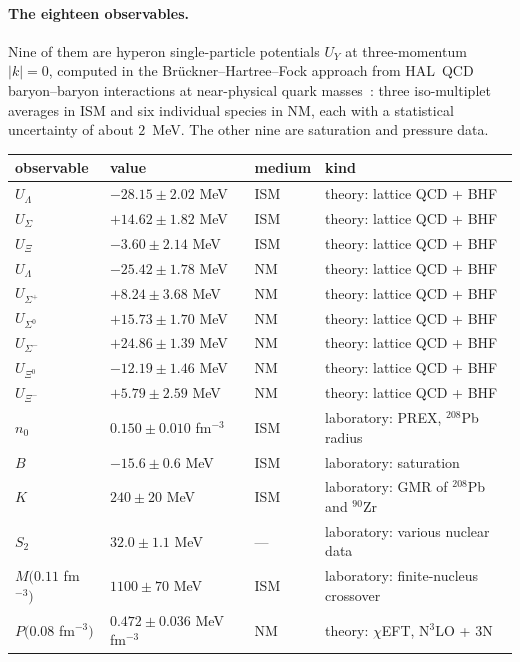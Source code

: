 \documentclass[aps,prc,onecolumn,superscriptaddress,nofootinbib,10pt]{revtex4-2}
\newcommand{\nzero}{n_0}
\begin{document}
\paragraph{The eighteen observables.} Nine of them are hyperon single-particle
potentials $U_Y$ at three-momentum $|k| = 0$, computed in the
Br\"uckner--Hartree--Fock approach from HAL~QCD baryon--baryon interactions at
near-physical quark masses~\cite{Kohno2024}: three iso-multiplet averages in
ISM and six individual species in NM, each with a statistical uncertainty of
about $2$~MeV. The other nine are saturation and pressure data.

\begin{table}[h]
\centering
\small
\begin{tabular}{@{}llll@{}}
\toprule
observable & value & medium & kind \\
\midrule
$U_\Lambda$   & $-28.15 \pm 2.02$ MeV & ISM & theory: lattice QCD + BHF \\
$U_\Sigma$    & $+14.62 \pm 1.82$ MeV & ISM & theory: lattice QCD + BHF \\
$U_\Xi$       & $-3.60 \pm 2.14$ MeV  & ISM & theory: lattice QCD + BHF \\
$U_\Lambda$   & $-25.42 \pm 1.78$ MeV & NM  & theory: lattice QCD + BHF \\
$U_{\Sigma^+}$& $+8.24 \pm 3.68$ MeV  & NM  & theory: lattice QCD + BHF \\
$U_{\Sigma^0}$& $+15.73 \pm 1.70$ MeV & NM  & theory: lattice QCD + BHF \\
$U_{\Sigma^-}$& $+24.86 \pm 1.39$ MeV & NM  & theory: lattice QCD + BHF \\
$U_{\Xi^0}$   & $-12.19 \pm 1.46$ MeV & NM  & theory: lattice QCD + BHF \\
$U_{\Xi^-}$   & $+5.79 \pm 2.59$ MeV  & NM  & theory: lattice QCD + BHF \\
\midrule
$\nzero$            & $0.150 \pm 0.010$ fm$^{-3}$ & ISM & laboratory: PREX, $^{208}$Pb radius \\
$B$                 & $-15.6 \pm 0.6$ MeV & ISM & laboratory: saturation \\
$K$                 & $240 \pm 20$ MeV & ISM & laboratory: GMR of $^{208}$Pb and $^{90}$Zr \\
$S_2$               & $32.0 \pm 1.1$ MeV & --- & laboratory: various nuclear data \\
$M(0.11$ fm$^{-3})$ & $1100 \pm 70$ MeV & ISM & laboratory: finite-nucleus crossover \\
$P(0.08$ fm$^{-3})$ & $0.472 \pm 0.036$ MeV\,fm$^{-3}$ & NM & theory: $\chi$EFT, N$^3$LO + 3N \\

\end{tabular}
\end{table}
\end{document}
